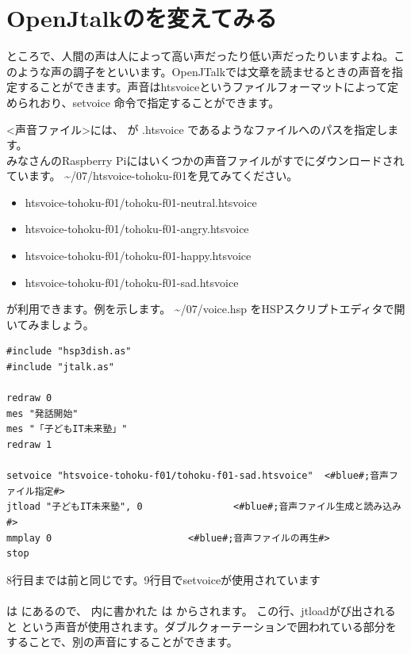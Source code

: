 \newpage
\section{OpenJtalkのを変えてみる}
ところで、人間の声は人によって高い声だったり低い声だったりいますよね。このような声の調子をといいます。OpenJTalkでは文章を読ませるときの声音を指定することができます。声音はhtsvoiceというファイルフォーマットによって定められおり、setvoice 命令で指定することができます。\\

<声音ファイル>には、 が .htsvoice であるようなファイルへのパスを指定します。\\
みなさんのRaspberry Piにはいくつかの声音ファイルがすでにダウンロードされています。  \textasciitilde /07/htsvoice-tohoku-f01を見てみてください。

\begin{itemize}
\item htsvoice-tohoku-f01/tohoku-f01-neutral.htsvoice
\item htsvoice-tohoku-f01/tohoku-f01-angry.htsvoice
\item htsvoice-tohoku-f01/tohoku-f01-happy.htsvoice
\item htsvoice-tohoku-f01/tohoku-f01-sad.htsvoice
\end{itemize}

が利用できます。例を示します。 \textasciitilde /07/voice.hsp をHSPスクリプトエディタで開いてみましょう。\\

\begin{lstlisting}[caption=voice.hsp,label=voice.hsp]
#include "hsp3dish.as"
#include "jtalk.as"

redraw 0
mes "発話開始"
mes "「子どもIT未来塾」"
redraw 1

setvoice "htsvoice-tohoku-f01/tohoku-f01-sad.htsvoice"	<#blue#;音声ファイル指定#>
jtload "子どもIT未来塾", 0				<#blue#;音声ファイル生成と読み込み#>
mmplay 0						<#blue#;音声ファイルの再生#>
stop
\end{lstlisting}

8行目までは前と同じです。9行目でsetvoiceが使用されています\\
\\
 は  にあるので、
 内に書かれた 
は  からされます。
この行、jtloadがび出されると 
という声音が使用されます。ダブルクォーテーションで囲われている部分をすることで、別の声音にすることができます。\\

\begin{tcolorbox}[title=\useOmetoi]
\begin{enumerate}
\end{enumerate}
\end{tcolorbox}
